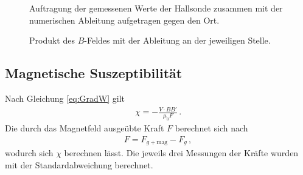 \documentclass[12pt,a4paper,titlepage,headinclude,bibtotoc]{scrartcl}
\begin{document}
\begin{figure}[h]
\centering
{}
\caption{Auftragung der gemessenen Werte der Hallsonde zusammen mit der numerischen Ableitung aufgetragen gegen den Ort.}
\label{fig:aus1}
\end{figure}
\begin{figure}[h]
\centering
{}
\caption{Produkt des $B$-Feldes mit der Ableitung an der jeweiligen Stelle.}
\label{fig:aus3}
\end{figure}

\subsection{Magnetische Suszeptibilität}
Nach Gleichung \eqref{eq:GradW} gilt 
\begin{align*}
	\chi=-\frac{V\cdot BB'}{\mu_0F}\, .
\end{align*}
Die durch das Magnetfeld ausgeübte Kraft $F$ berechnet sich nach
\begin{align}
	F=F_{g+\text{mag}}-F_g\, ,
\end{align}
wodurch sich $\chi$ berechnen lässt.
Die jeweils drei Messungen der Kräfte wurden mit der Standardabweichung berechnet.
\end{document}
